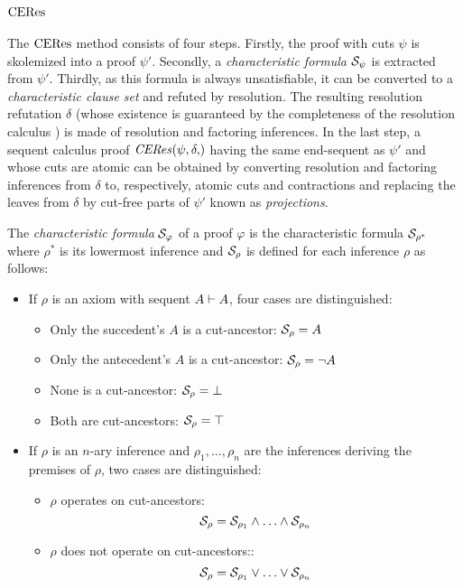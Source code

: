 \section{$\mathrm{CERes}$}
\label{sec:CERes}


The $\mathrm{CERes}$ method consists of four steps. Firstly, the proof with cuts $\psi$ is skolemized into a proof $\psi'$. Secondly, a \emph{characteristic formula} $\mathcal{S}_{\psi}$ is extracted from $\psi'$. Thirdly, as this formula is always unsatisfiable, it can be converted to a \emph{characteristic clause set} and refuted by resolution. The resulting resolution refutation $\delta$ (whose existence is guaranteed by the completeness of the resolution calculus \cite{ToDo}) is made of resolution and factoring inferences. In the last step, a sequent calculus proof $\CEResNF{\psi,\delta}$ having the same end-sequent as $\psi'$ and whose cuts are atomic can be obtained by converting resolution and factoring inferences from $\delta$ to, respectively, atomic cuts and contractions and replacing the leaves from $\delta$ by cut-free parts of $\psi'$ known as \emph{projections}.


\begin{definition}
\label{definition:PertinentStruct}
The \emph{characteristic formula} $\mathcal{S}_{\varphi}$ of a proof $\varphi$ is the characteristic formula $\mathcal{S}_{\rho^*}$ where $\rho^*$ is its lowermost inference and $\mathcal{S}_{\rho}$ is defined for each inference $\rho$ as follows:

\begin{itemize}
	\item If $\rho$ is an axiom with sequent $A \vdash A$, four cases are distinguished:
	\begin{itemize}	 	
	 	\item Only the succedent's $A$ is a cut-ancestor: $\mathcal{S}_{\rho} = A$
	 	\item Only the antecedent's $A$ is a cut-ancestor: $\mathcal{S}_{\rho} = \neg A $
	 	\item None is a cut-ancestor: $\mathcal{S}_{\rho} = \bot $
	 	\item Both are cut-ancestors: $\mathcal{S}_{\rho} = \top$
	\end{itemize}

	\item If $\rho$ is an $n$-ary inference and $\rho_1,\ldots,\rho_n$ are the inferences deriving the premises of $\rho$, two cases are distinguished:
	\begin{itemize}
		\item $\rho$ operates on cut-ancestors:
$$
\mathcal{S}_{\rho} = 
		\mathcal{S}_{\rho_1} \wedge \ldots \wedge \mathcal{S}_{\rho_n}
$$

	\item $\rho$ does not operate on cut-ancestors::
$$
\mathcal{S}_{\rho} = 
		\mathcal{S}_{\rho_1} \vee \ldots \vee \mathcal{S}_{\rho_n}
$$
	\end{itemize}
\end{itemize}
\end{definition}


